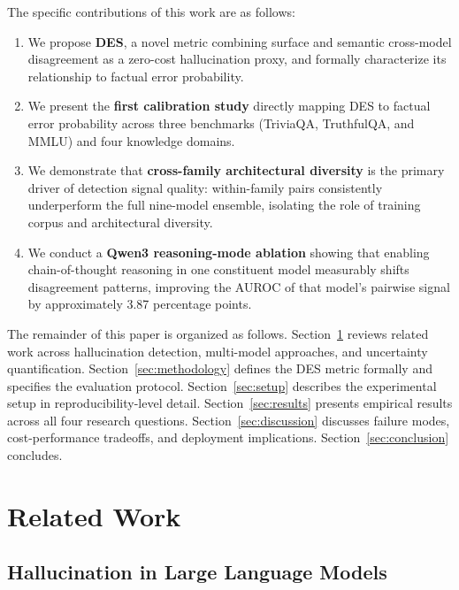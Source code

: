 \documentclass[journal]{IEEEtran}
\begin{document}
The specific contributions of this work are as follows:
\begin{enumerate}
  \item We propose \textbf{DES}, a novel metric combining surface and
    semantic cross-model disagreement as a zero-cost hallucination proxy,
    and formally characterize its relationship to factual error probability.
  \item We present the \textbf{first calibration study} directly mapping
    DES to factual error probability across three benchmarks (TriviaQA,
    TruthfulQA, and MMLU) and four knowledge domains.
  \item We demonstrate that \textbf{cross-family architectural diversity}
    is the primary driver of detection signal quality: within-family pairs
    consistently underperform the full nine-model ensemble, isolating the role of
    training corpus and architectural diversity.
  \item We conduct a \textbf{Qwen3 reasoning-mode ablation} showing that
    enabling chain-of-thought reasoning in one constituent model measurably
    shifts disagreement patterns, improving the AUROC of that model's
    pairwise signal by approximately 3.87 percentage points.
\end{enumerate}

The remainder of this paper is organized as follows.
Section~\ref{sec:related} reviews related work across hallucination
detection, multi-model approaches, and uncertainty quantification.
Section~\ref{sec:methodology} defines the DES metric formally and
specifies the evaluation protocol.
Section~\ref{sec:setup} describes the experimental setup in
reproducibility-level detail.
Section~\ref{sec:results} presents empirical results across all four
research questions.
Section~\ref{sec:discussion} discusses failure modes, cost-performance
tradeoffs, and deployment implications.
Section~\ref{sec:conclusion} concludes.

\section{Related Work}
\label{sec:related}

\subsection{Hallucination in Large Language Models}
\end{document}

